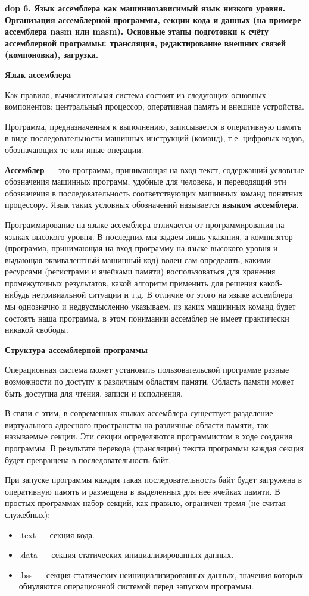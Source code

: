 \textbf{\LARGE dop 6. Язык  ассемблера  как  машиннозависимый  язык  низкого  уровня.  Организация  ассемблерной  программы, секции кода и данных (на примере ассемблера nasm или masm). Основные  этапы подготовки к счёту ассемблерной программы: трансляция, редактирование внешних связей (компоновка), загрузка.}

\textbf{Язык ассемблера}

Как правило, вычислительная система состоит из следующих основных компонентов: центральный процессор, оперативная память и внешние устройства. 

Программа, предназначенная к выполнению, записывается в оперативную память в виде последовательности машинных инструкций (команд), т.е. цифровых кодов, обозначающих те или иные операции.

\textbf{Ассемблер} --- это программа, принимающая на вход текст, содержащий условные обозначения машинных программ, удобные для человека, и переводящий эти обозначения в последовательность соответствующих машинных команд понятных процессору. 
Язык таких условных обозначений называется \textbf{языком ассемблера}.

Программирование на языке ассемблера отличается от программирования на языках высокого уровня. 
В последних мы задаем лишь указания, а компилятор (программа, принимающая на вход программу на языке высокого уровня и выдающая эквивалентный машинный код) волен сам определять, какими ресурсами (регистрами и ячейками памяти) воспользоваться для хранения промежуточных результатов, какой алгоритм применить для решения какой-нибудь нетривиальной ситуации и т.д. 
В отличие от этого на языке ассемблера мы однозначно и недвусмысленно указываем, из каких машинных команд будет состоять наша программа, в этом понимании ассемблер не имеет практически никакой свободы.

\textbf{Структура ассемблерной программы}

Операционная система может установить пользовательской программе разные возможности по доступу к различным областям памяти. Область памяти может быть доступна для чтения, записи и исполнения.

В связи с этим, в современных языках ассемблера существует разделение виртуального адресного пространства на различные области памяти, так называемые секции. 
Эти секции определяются программистом в ходе создания программы.
В результате перевода (трансляции) текста программы каждая секция будет превращена в последовательность байт. 

При запуске программы каждая такая последовательность байт будет загружена в оперативную память и размещена в выделенных для нее ячейках памяти. 
В простых программах набор секций, как правило, ограничен тремя (не считая служебных): 
 \begin{itemize}
     \item .text --- секция кода.
     \item .data --- секция статических инициализированных данных.
     \item .bss --- секция статических неинициализированных данных, значения которых обнуляются операционной системой перед запуском программы.
 \end{itemize}
 
